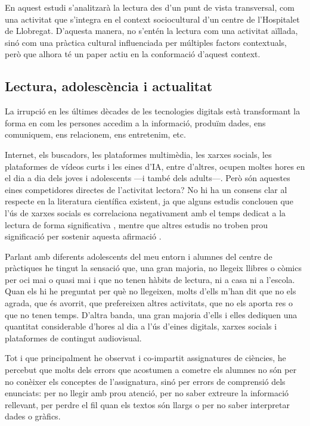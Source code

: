 \documentclass[12pt]{article}
\begin{document}
En aquest estudi s'analitzarà la lectura des d'un punt de vista transversal, com una activitat que s'integra en el context sociocultural d'un centre de l'Hospitalet de Llobregat. D'aquesta manera, no s'entén la lectura com una activitat aïllada, sinó com una pràctica cultural influenciada per múltiples factors contextuals, però que alhora té un paper actiu en la conformació d'aquest context.

\subsection{Lectura, adolescència i actualitat}

La irrupció en les últimes dècades de les tecnologies digitals està transformant la forma en com les persones accedim a la informació, produïm dades, ens comuniquem, ens relacionem, ens entretenim, etc.

Internet, els buscadors, les plataformes multimèdia, les xarxes socials, les plataformes de vídeos curts i les eines d’IA, entre d’altres, ocupen moltes hores en el dia a dia dels joves i adolescents \parencite{shutaleva} ---i també dels adults---. Però són aquestes eines competidores directes de l'activitat lectora? No hi ha un consens clar al respecte en la literatura científica existent, ja que alguns estudis conclouen que l'ús de xarxes socials es correlaciona negativament amb el temps dedicat a la lectura de forma significativa \parencite{akande_library}, mentre que altres estudis no troben prou significació per sostenir aquesta afirmació \parencite{shutaleva}. 

Parlant amb diferents adolescents del meu entorn i alumnes del centre de pràctiques he tingut la sensació que, una gran majoria, no llegeix llibres o còmics per oci mai o quasi mai i que no tenen hàbits de lectura, ni a casa ni a l'escola. Quan els hi he preguntat per què no llegeixen, molts d'ells m'han dit que no els agrada, que és avorrit, que prefereixen altres activitats, que no els aporta res o que no tenen temps. D'altra banda, una gran majoria d'ells i elles dediquen una quantitat considerable d'hores al dia a l'ús d'eines digitals, xarxes socials i plataformes de contingut audiovisual.

Tot i que principalment he observat i co-impartit assignatures de ciències, he percebut que molts dels errors que acostumen a cometre els alumnes no són per no conèixer els conceptes de l'assignatura, sinó per errors de comprensió dels enunciats: per no llegir amb prou atenció, per no saber extreure la informació rellevant, per perdre el fil quan els textos són llargs o per no saber interpretar dades o gràfics.
\end{document}

